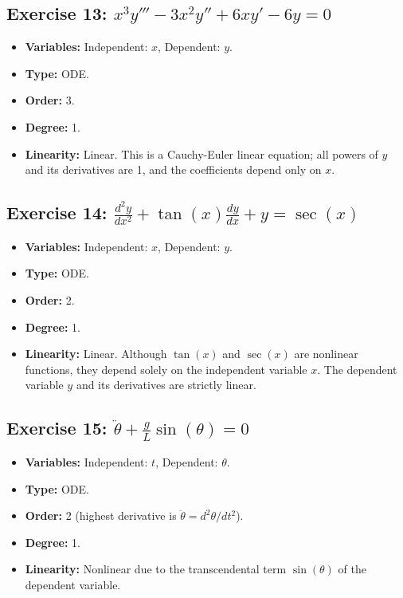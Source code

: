 \documentclass[11pt,letterpaper]{article}
\begin{document}
\subsection*{Exercise 13: $x^3 y''' - 3x^2 y'' + 6xy' - 6y = 0$}
\begin{itemize}
    \item \textbf{Variables:} Independent: $x$, Dependent: $y$.
    \item \textbf{Type:} ODE.
    \item \textbf{Order:} 3.
    \item \textbf{Degree:} 1.
    \item \textbf{Linearity:} Linear. This is a Cauchy-Euler linear equation; all powers of $y$ and its derivatives are 1, and the coefficients depend only on $x$.
\end{itemize}

\subsection*{Exercise 14: $\frac{d^2 y}{dx^2} + \tan(x) \frac{dy}{dx} + y = \sec(x)$}
\begin{itemize}
    \item \textbf{Variables:} Independent: $x$, Dependent: $y$.
    \item \textbf{Type:} ODE.
    \item \textbf{Order:} 2.
    \item \textbf{Degree:} 1.
    \item \textbf{Linearity:} Linear. Although $\tan(x)$ and $\sec(x)$ are nonlinear functions, they depend solely on the independent variable $x$. The dependent variable $y$ and its derivatives are strictly linear.
\end{itemize}

\subsection*{Exercise 15: $\ddot{\theta} + \frac{g}{L} \sin(\theta) = 0$}
\begin{itemize}
    \item \textbf{Variables:} Independent: $t$, Dependent: $\theta$.
    \item \textbf{Type:} ODE.
    \item \textbf{Order:} 2 (highest derivative is $\ddot{\theta} = d^2\theta/dt^2$).
    \item \textbf{Degree:} 1.
    \item \textbf{Linearity:} Nonlinear due to the transcendental term $\sin(\theta)$ of the dependent variable.
\end{itemize}
\end{document}

